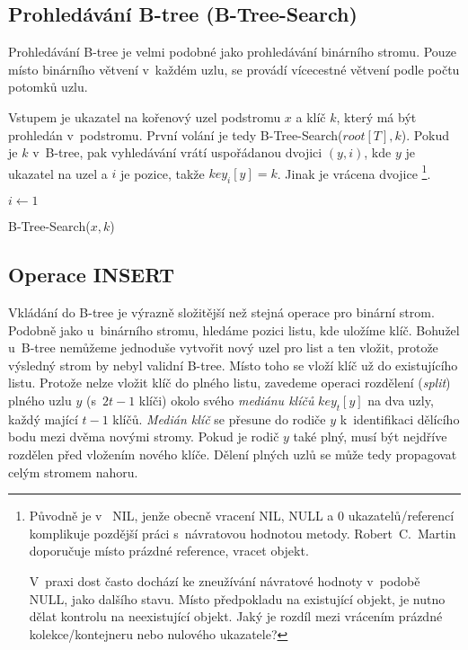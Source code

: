 \subsection{Prohledávání B-tree (B-Tree-Search)}

Prohledávání B-tree je velmi podobné jako prohledávání binárního stromu\@.
Pouze místo binárního větvení v~každém uzlu, se provádí vícecestné
větvení podle počtu potomků uzlu\@.

Vstupem je ukazatel na kořenový uzel podstromu $x$ a klíč $k$, který
má být prohledán v~podstromu\@. První volání je tedy B-Tree-Search($root[T],k$).
Pokud je $k$ v~B-tree, pak vyhledávání vrátí uspořádanou dvojici
$(y,i)$, kde $y$ je ukazatel na uzel a $i$ je pozice, takže $key_{i}[y]=k$\@.
Jinak je vrácena  dvojice%
\footnote{Původně je v~\cite{Cormen:2001:IA:580470} NIL, jenže obecně vracení
NIL, NULL a 0 ukazatelů/referencí komplikuje pozdější práci s~návratovou
hodnotou metody. Robert~C.~Martin doporučuje místo prázdné
reference, vracet  objekt\cite{martin2009clean}.

V~praxi dost často dochází ke zneužívání návratové hodnoty v~podobě
NULL, jako dalšího stavu. Místo předpokladu na existující objekt,
je nutno dělat kontrolu na neexistující objekt. Jaký je rozdíl mezi
vrácením prázdné kolekce/kontejneru nebo nulového ukazatele?%
}\@.

\begin{algorithm}[t]
\SetAlgoLined
{}

$i \longleftarrow 1$\\

\caption{B-Tree-Search($x,k$)}
\end{algorithm}



\subsection{Operace INSERT}

Vkládání do B-tree je výrazně složitější než stejná operace pro binární
strom\@. Podobně jako u~binárního stromu, hledáme pozici listu,
kde uložíme klíč. Bohužel u~B-tree nemůžeme jednoduše vytvořit nový
uzel pro list a ten vložit, protože výsledný strom by nebyl validní
B-tree\@. Místo toho se vloží klíč už do existujícího listu\@. Protože
nelze vložit klíč do plného listu, zavedeme operaci rozdělení (\emph{split})
plného uzlu $y$ (s~$2t-1$ klíči) okolo svého \emph{mediánu klíčů}
$key_{t}[y]$ na dva uzly, každý mající $t-1$ klíčů\@. \emph{Medián
klíč} se přesune do rodiče $y$ k~identifikaci dělícího bodu mezi
dvěma novými stromy\@. Pokud je rodič $y$ také plný, musí být nejdříve
rozdělen před vložením nového klíče. Dělení plných uzlů se může tedy
propagovat celým stromem nahoru.


